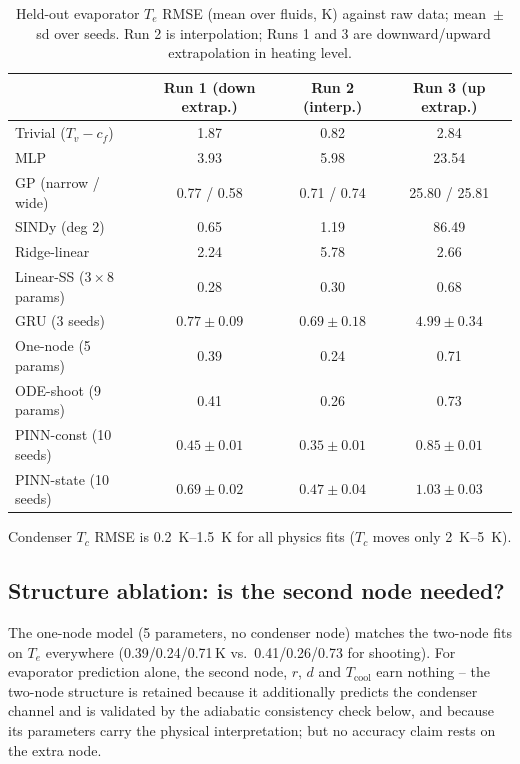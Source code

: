 \begin{table}[t]\centering\small
\caption{Held-out evaporator $T_e$ RMSE (mean over fluids, K) against raw data; mean~$\pm$~sd over seeds.
Run 2 is interpolation; Runs 1 and 3 are downward/upward extrapolation in heating level.}
\label{tab:loro}
\begin{tabular}{lccc}
\toprule
 & Run 1 (down extrap.) & Run 2 (interp.) & Run 3 (up extrap.) \\
\midrule
Trivial ($T_v{-}c_f$) & 1.87 & 0.82 & 2.84 \\
MLP            & 3.93 & 5.98 & 23.54 \\
GP (narrow / wide) & 0.77 / 0.58 & 0.71 / 0.74 & 25.80 / 25.81 \\
SINDy (deg 2)  & 0.65 & 1.19 & 86.49 \\
Ridge-linear   & 2.24 & 5.78 & 2.66 \\
Linear-SS ($3{\times}8$ params) & 0.28 & 0.30 & $\mathbf{0.68}$ \\
GRU (3 seeds)  & $0.77\pm0.09$ & $0.69\pm0.18$ & $\mathbf{4.99\pm0.34}$ \\
One-node (5 params) & 0.39 & 0.24 & 0.71 \\
ODE-shoot (9 params) & 0.41 & 0.26 & 0.73 \\
PINN-const (10 seeds) & $0.45\pm0.01$ & $0.35\pm0.01$ & $0.85\pm0.01$ \\
PINN-state (10 seeds) & $0.69\pm0.02$ & $0.47\pm0.04$ & $1.03\pm0.03$ \\
\bottomrule
\end{tabular}
\end{table}

Condenser $T_c$ RMSE is \SIrange{0.2}{1.5}{\kelvin} for all physics fits ($T_c$ moves only \SIrange{2}{5}{\kelvin}).

\subsection{Structure ablation: is the second node needed?}
The one-node model (5 parameters, no condenser node) matches the two-node fits on $T_e$ everywhere
(0.39/0.24/0.71\,K vs.\ 0.41/0.26/0.73 for shooting). For evaporator prediction alone, the second node, $r$, $d$
and $T_{\mathrm{cool}}$ earn nothing -- the two-node structure is retained because it additionally predicts the
condenser channel and is validated by the adiabatic consistency check below, and because its parameters carry
the physical interpretation; but no accuracy claim rests on the extra node.

